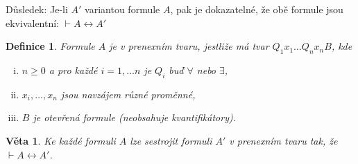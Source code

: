 \documentclass[a4paper, 11pt]{report}
\newtheorem{mydef}{Definice}[chapter]
\newtheorem{veta}{Věta}
\begin{document}
Důsledek: Je-li $A'$ variantou formule $A$, pak je dokazatelné, že obě formule jsou ekvivalentní: $\vdash A \leftrightarrow A'$

\begin{mydef}
Formule $A$ je v \emph{prenexním tvaru}, jestliže má tvar $Q_1 x_1 \dots Q_n x_n B$, kde
\begin{enumerate}[(i)]
	\item $n \geq 0$ a pro každé $i = 1, \dots n$ je $Q_i$ buď $\forall$ nebo $\exists$,
	\item $x_i, \dots, x_n$  jsou navzájem různé proměnné,
	\item $B$ je otevřená formule (neobsahuje kvantifikátory).
\end{enumerate}
\end{mydef}

\begin{veta}
Ke každé formuli $A$ lze sestrojit formuli $A'$ v prenexním tvaru tak, že $\vdash A \leftrightarrow A'$.
\end{veta}
\end{document}
